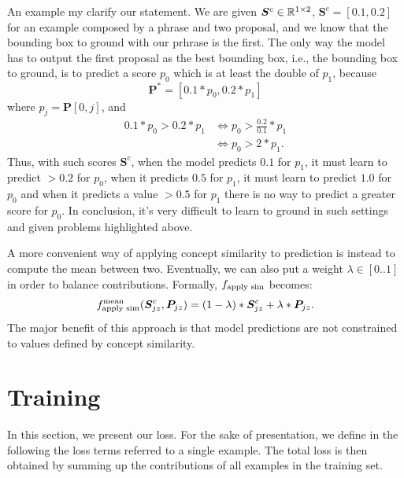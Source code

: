 An example my clarify our statement. We are given $\bm{S}^c \in
\mathbb{R}^{1 \times 2}$, $\bm{S}^c = [0.1, 0.2]$ for an example composed by a
phrase and two proposal, and we know that the bounding box to ground
with our prhrase is the first. The only way the model has to output
the first proposal as the best bounding box, i.e., the bounding box to
ground, is to predict a score $p_{0}$ which is at least the double of
$p_{1}$, because
\begin{equation}
  \bm{P}^* = [0.1 * p_{0}, 0.2 * p_{1}]
\end{equation}
where $p_{j} = \bm{P}[0, j]$, and 
\begin{equation}
\begin{split}
0.1 * p_{0} > 0.2 * p_{1} & \iff p_{0} >  \frac{0.2}{0.1} * p_{1} \\
  & \iff p_{0} > 2 * p_{1}.
\end{split}
\end{equation}
Thus, with such scores $\bm{S}^c$, when the model predicts $0.1$ for
$p_1$, it must learn to predict $> 0.2$ for $p_0$, when it predicts
$0.5$ for $p_1$, it must learn to predict $1.0$ for $p_0$ and when it
predicts a value $> 0.5$ for $p_1$ there is no way to predict a
greater score for $p_0$. In conclusion, it's very difficult to learn
to ground in such settings and given problems highlighted above.

A more convenient way of applying concept similarity to prediction is
instead to compute the mean between two. Eventually, we can also put a
weight $\lambda \in [0 .. 1]$ in order to balance
contributions. Formally, $f_{\text{apply sim}}$ becomes:
\begin{equation}
  f_{\text{apply sim}}^{\text{mean}} (\bm{S}^c_{jz}, \bm{P}_{jz}) = (1 - \lambda) * \bm{S}^c_{jz} + \lambda * \bm{P}_{jz}.
\end{equation}
The major benefit of this approach is that model predictions are not
constrained to values defined by concept similarity.

\section{Training}

In this section, we present our loss. For the sake of presentation, we
define in the following the loss terms referred to a single example.
The total loss is then obtained by summing up the contributions of all
examples in the training set.

